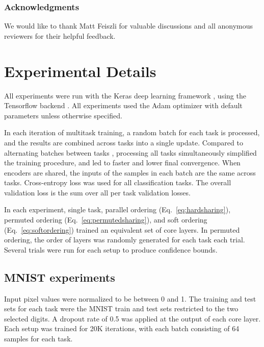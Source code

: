 \documentclass{article}
\theoremstyle{definition}
\theoremstyle{remark}
\begin{document}
\subsubsection*{Acknowledgments}

We would like to thank Matt Feiszli for valuable discussions and all anonymous reviewers for their helpful feedback.


\begin{small}


\end{small}


\appendix
\section{Experimental Details} \label{app:details}

All experiments were run with the Keras deep learning framework \cite{Chollet:2015}, using the Tensorflow backend \citep{Agarwal:2015}.
All experiments used the Adam optimizer with default parameters \citep{Kingma:14} unless otherwise specified.

In each iteration of multitask training, a random batch for each task is processed, and the results are combined across tasks into a single update.
Compared to alternating batches between tasks \citep{Luong:2016}, processing all tasks simultaneously simplified the training procedure, and led to faster and lower final convergence.
When encoders are shared, the inputs of the samples in each batch are the same across tasks.
Cross-entropy loss was used for all classification tasks.
The overall validation loss is the sum over all per task validation losses.

In each experiment, single task, parallel ordering (Eq.~\ref{eq:hardsharing}), permuted ordering (Eq.~\ref{eq:permutedsharing}), and soft ordering (Eq.~\ref{eq:softordering}) trained an equivalent set of core layers.
In permuted ordering, the order of layers was randomly generated for each task each trial.
Several trials were run for each setup to produce confidence bounds.

\subsection{MNIST experiments} \label{app:mnist}

Input pixel values were normalized to be between 0 and 1.
The training and test sets for each task were the MNIST train and test sets restricted to the two selected digits.
A dropout rate of 0.5 was applied at the output of each core layer.
Each setup was trained for 20K iterations, with each batch consisting of 64 samples for each task.
\end{document}
